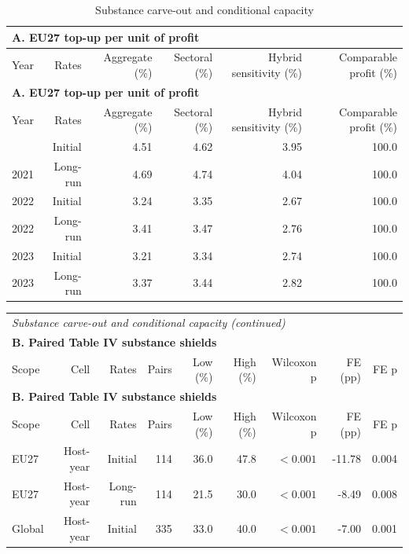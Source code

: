{\small\setlength{\LTpre}{4pt}\setlength{\LTpost}{4pt}
\begin{longtable}{@{}lrrrrr@{}}
\caption{Substance carve-out and conditional capacity}\label{tab:tab_v2_stage2_sbti_and_bracket_substance} \\
\multicolumn{6}{l}{\textbf{A. EU27 top-up per unit of profit}} \\
\toprule
Year & Rates & Aggregate (\%) & Sectoral (\%) & Hybrid sensitivity (\%) & Comparable profit (\%) \\
\midrule
\endfirsthead
\multicolumn{6}{l}{\textbf{A. EU27 top-up per unit of profit}} \\
\toprule
Year & Rates & Aggregate (\%) & Sectoral (\%) & Hybrid sensitivity (\%) & Comparable profit (\%) \\
\midrule
\endhead
\midrule
\endfoot
\bottomrule
\endlastfoot
2021 & Initial & 4.51 & 4.62 & 3.95 & 100.0 \\
2021 & Long-run & 4.69 & 4.74 & 4.04 & 100.0 \\
2022 & Initial & 3.24 & 3.35 & 2.67 & 100.0 \\
2022 & Long-run & 3.41 & 3.47 & 2.76 & 100.0 \\
2023 & Initial & 3.21 & 3.34 & 2.74 & 100.0 \\
2023 & Long-run & 3.37 & 3.44 & 2.82 & 100.0 \\
\end{longtable}
\addtocounter{table}{-1}
\begin{longtable}{@{}lrrrrrrrr@{}}
\multicolumn{9}{l}{\textit{Substance carve-out and conditional capacity (continued)}} \\
\multicolumn{9}{l}{\textbf{B. Paired Table IV substance shields}} \\
\toprule
Scope & Cell & Rates & Pairs & Low (\%) & High (\%) & Wilcoxon p & FE (pp) & FE p \\
\midrule
\endfirsthead
\multicolumn{9}{l}{\textbf{B. Paired Table IV substance shields}} \\
\toprule
Scope & Cell & Rates & Pairs & Low (\%) & High (\%) & Wilcoxon p & FE (pp) & FE p \\
\midrule
\endhead
\midrule
\endfoot
\bottomrule
\endlastfoot
EU27 & Host-year & Initial & 114 & 36.0 & 47.8 & $<0.001$ & -11.78 & 0.004 \\
EU27 & Host-year & Long-run & 114 & 21.5 & 30.0 & $<0.001$ &  -8.49 & 0.008 \\
Global & Host-year & Initial & 335 & 33.0 & 40.0 & $<0.001$ &  -7.00 & 0.001 \\

\end{longtable}}
